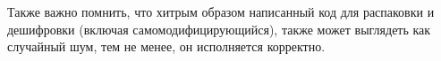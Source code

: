 







Также важно помнить, что хитрым образом написанный код для распаковки и дешифровки (включая самомодифицирующийся),
также может выглядеть как случайный шум, тем не менее, он исполняется корректно.

